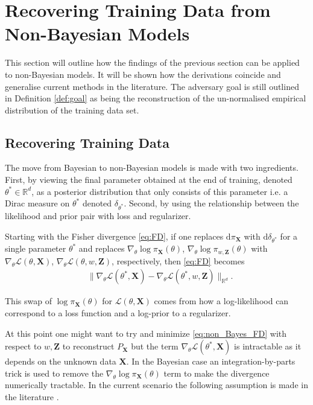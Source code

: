 \documentclass[hyperref]{article}
\theoremstyle{plain}
\theoremstyle{remark}
\newcommand{\bX}{\mathbf{X}}
\newcommand{\bZ}{\mathbf{Z}}
\newcommand{\bbR}{\mathbb{R}}
\newcommand{\calL}{\mathcal{L}}
\begin{document}
\section{Recovering Training Data from Non-Bayesian Models}\label{sec:non_bayesian}
This section will outline how the findings of the previous section can be applied to non-Bayesian models. It will be shown how the derivations coincide and generalise current methods in the literature. The adversary goal is still outlined in Definition \ref{def:goal} as being the reconstruction of the un-normalised empirical distribution of the training data set. 

\subsection{Recovering Training Data}\label{subsec:non_bayesian_recovery}
The move from Bayesian to non-Bayesian models is made with two ingredients. First, by viewing the final parameter obtained at the end of training, denoted $\theta^{*}\in\bbR^{d}$, as a posterior distribution that only consists of this parameter i.e. a Dirac measure on $\theta^{*}$ denoted $\delta_{\theta^{*}}$. Second, by using the relationship between the likelihood and prior pair with loss and regularizer. 

Starting with the Fisher divergence \eqref{eq:FD}, if one replaces $\mathrm{d}\pi_{\bX}$ with $\mathrm{d}\delta_{\theta^{*}}$ for a single parameter $\theta^{*}$ and replaces $\nabla_{\theta}\log\pi_{\bX}(\theta)$, $\nabla_{\theta}\log\pi_{w,\bZ}(\theta)$ with $\nabla_{\theta}\calL(\theta,\bX)$, $\nabla_{\theta}\calL(\theta,w,\bZ)$, respectively, then \eqref{eq:FD} becomes
\begin{align}
	&\lVert \nabla_{\theta}\calL(\theta^{*},\bX) - \nabla_{\theta}\calL(\theta^{*},w,\bZ)\rVert_{\bbR^{d}}.\label{eq:non_Bayes_FD}
\end{align}

This swap of $\log\pi_{\bX}(\theta)$ for $\calL(\theta,\bX)$ comes from how a log-likelihood can correspond to a loss function and a log-prior to a regularizer.

At this point one might want to try and minimize \eqref{eq:non_Bayes_FD} with respect to $w,\bZ$ to reconstruct $P_{\bX}$ but the term $\nabla_{\theta}\calL(\theta^{*},\bX)$ is intractable as it depends on the unknown data $\bX$. In the Bayesian case an integration-by-parts trick is used to remove the $\nabla_{\theta}\log\pi_{\bX}(\theta)$ term to make the divergence numerically tractable. In the current scenario the following assumption is made in the literature \citep{Haim2022,buzaglo2023deconstructing}.
\end{document}
